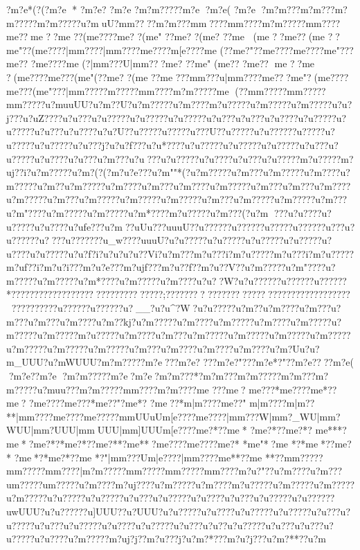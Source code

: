 {{{{{{{{{{{{{{{{{{{{{{{{{{{{{{{{{{{{{{{{{{{{{{{{{{{{{{{{{{{{{{{{{{{{{{{{{{{{?m?e*(?(?m?e
*
?m?e?   ?m?e    ?m?m?????m?e   ?m?e(   ?m?e   ?m?m???m?m???m?m?????m?m?????u?muU?m{m????m?m???m{m????m{m????{m?m?????m{m????{m{e?? {m{e
??{m{e ??({m{e????{m{e? ?({m{e" ??{m{e? ?({m{e? ??{m{e ({m{e ??{m{e??({m{e
??{m{e"??({m{e????|m{m????|m{m????{m{e????{m[e????{m{e
(??{m{e?"??{m{e????{m{e????{m{e"???{m{e??
?{m{e????{m{e
(? |m{m???U|m{m???{m{e? ??{m{e" ( {m{e?? ?{m{e?? {m{e
??{m{e ?({m{e????{m{e???({m{e"(??{m{e? ?({m{e  ??{m{e
 ???m{m???u|m{m????{m{e???{m{e"?({m{e????{m{e???({m{e"???|m{m?????m\e?????m{m????{m?m?????m{e (??m{m?????m{m?????m{m?????u?muuUU?u?m??U}?u?m?????u?m????m?u?????u?m?????u?m?????u?u?j???u?uZ????u?u???u?u?????u?u?????u?u?????u?u???u?u???u?u????u?u?????u?u?????u?u???u?u???}?u?u?U?}?u????}?u???}?}?u???U?}?u?????u?u?????}?u?????u?u?????u?u?????u?u???j?u?u?f???u?u*????u?u?????u?u?????u?u?????u?u???u?u?????u?u ????u?u  ???u?m  ???u?u???u?u?????u?u????u?u???u?u?????m?u?????m?uj??i?u?m?????u?m?(?(?m?u?e???u?m""*(?u?m?????u?m???u?m?????u?m????u?m?????u?m??u?m?????u?m????u?m???u?m????u?m?????u?m???u?m???u?m????u?m?????u?m???u?m?????u?m?????u?m?????u?m???u?m?????u?m?????u?m???u?m"????u?m?????u?m?????u?m*????m?u?????u?m???(?u?m ???u?u????u?u?????u?u????u?ufe???u?m   ?}?uUu?}?}?uuu}U?}?u?????}?u?????}?u????}?u?????}?u???u?u?????}?u????u?}?????}?u_w???}?uuu}U?u?u?????u?u?????u?u?????u?u?????u?u????u?u?????u?u?f?i?u?u    ?u?u??Vi?u?m???m?u???i?m?u?????m?u???i?m?u?????m?uf??i?m?u?i???m?u?e???m?ujf???m?u??f??m?u??V??u?m?????u?m"????u?m?????u?m?????u?m*????u?m?????u?m????u?u??W?u?u?????}?u?????}?u?????}?}*??????}??????????????????????????;??????????????????????????????????????}???}?}?????}?u?????}?u?????}?u?__?u?u^?W?u?u?????u?m??u?m????u?m???u?m???u?m???u?m????u?m??kj?u?m?????u?m????u?m?????u?m????u?m?????u?m?????u?m?????m?u?????u?m????u?m???u?m?????u?m?????u?m?????u?m?????u?m?????u?m?????u?m?????u?m???u?m????u?m????u?m???}?u?m?Uu?u?m_UUU?u?mWUUU?m?m?????m?e ???m?e? ???m?e?"???m?e*?"??m?e????m?e(
 ?m?e?   ?m?e   ?m?m?????m?e   ?m?e   ?m?m???*?m?m???m?m?????m?m???m?m?????u?muu???m?m?????m{m????{m?m????{m{e
???{m{e?
 {m{e???*{m{e????{m{e*?? {m{e?
?{m{e????{m{e???*{m{e??"?{m{e*?
?{m{e??*{m|m????{m{e??" {m|m????{m|m??**|m{m????{m{e????{m{e?????m{mUUuU{m[e????{m{e????|m{m???W|m{m?_WU|m{m?WUU|m{m?UUU|m{mUUU|m{m]UUU{m[e????{m{e?*??{m{e*
?{m{e?*??{m{e?*? {m{e***?{m{e*?{m{e?*?*{m{e?*??{m{e?**?{m{e**?{m{e????{m{e????{m{e?*
*{m{e"*?{m{e
*?*{m{e*??{m{e?*
?{m{e*?*{m{e?*??{m{e
*?"|m{m???U{m|e????|m{m????{m{e**??{m{e
**??m{m?????m{m?????m{m????|m?m?????m{m?????m{m?????m{m????m?u?"? ?u?m????u?m???u{m?????u{m?????u?m????m?uj????u?m?????u?m????m?u?????u?m?????u?m?????u?m?????u?u?????u?u?????u?u???u?u?????u?u????u?u???u?u?????u?u?????}?uwUUU?u?u?????}?u]UUU?}?u?UUU?u?u?????u?u ????u?u?????u?u?????u?u???u?u?????u?u???u?u?????u?u????u?u?????u?u???u?u??u?u?????u?u???u?u???u?u?????u?u????u?m?????m?uj?j??m?u???j?u?m?*???m?u?j???u?m?**??u?m
}}}}}}}}}}}}}}}}}}}}}}}}}}}}}}}}}}}}}}}}}}}}}}}}}}}}}}}}}}}}}}}}}}}}}}}}}}}}}}}}}}}}}}}}}}}}}}}}}}}}}}}}}}}}}}}}}}}}}}}}}}}}}}}}}}}}}}}}}}}}}}}}}}}}}}}}}}}}}}}}}}}}}}}}}}}}}}}}}}}}}}}}}}}}}}}}}}}}}}}}}}}}}}}}}}}}}}}}}}}}}}}}}}}}}}}}}}}}}}
